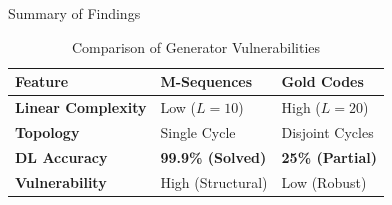 \documentclass[aspectratio=169, 11pt]{beamer}
\begin{document}
\begin{frame}{Summary of Findings}
    \begin{table}[]
    \centering
    \begin{tabular}{@{}lll@{}}
    \toprule
    \textbf{Feature} & \textbf{M-Sequences} & \textbf{Gold Codes} \\ \midrule
    \textbf{Linear Complexity} & Low ($L=10$) & High ($L=20$) \\
    \textbf{Topology} & Single Cycle & Disjoint Cycles \\
    \textbf{DL Accuracy} & \textbf{99.9\% (Solved)} & \textbf{25\% (Partial)} \\
    \textbf{Vulnerability} & High (Structural) & Low (Robust) \\ \bottomrule
    \end{tabular}
    \caption{Comparison of Generator Vulnerabilities}
    \end{table}
\end{frame}
\end{document}

